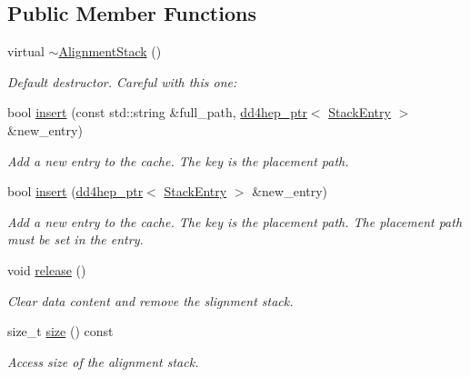 \subsection*{Public Member Functions}
\begin{DoxyCompactItemize}
\item 
virtual \hyperlink{class_d_d4hep_1_1_alignments_1_1_alignment_stack_aaa0a50b4ba221d1591a3cdadbc06153c}{$\sim$\+Alignment\+Stack} ()
\begin{DoxyCompactList}\small\item\em Default destructor. Careful with this one\+: \end{DoxyCompactList}\item 
bool \hyperlink{class_d_d4hep_1_1_alignments_1_1_alignment_stack_a9970de258fa1c3ea148a70de782f2398}{insert} (const std\+::string \&full\+\_\+path, \hyperlink{class_d_d4hep_1_1dd4hep__ptr}{dd4hep\+\_\+ptr}$<$ \hyperlink{struct_d_d4hep_1_1_alignments_1_1_alignment_stack_1_1_stack_entry}{Stack\+Entry} $>$ \&new\+\_\+entry)
\begin{DoxyCompactList}\small\item\em Add a new entry to the cache. The key is the placement path. \end{DoxyCompactList}\item 
bool \hyperlink{class_d_d4hep_1_1_alignments_1_1_alignment_stack_aefce20c233a0ad85d6a5c54ac2fb43b7}{insert} (\hyperlink{class_d_d4hep_1_1dd4hep__ptr}{dd4hep\+\_\+ptr}$<$ \hyperlink{struct_d_d4hep_1_1_alignments_1_1_alignment_stack_1_1_stack_entry}{Stack\+Entry} $>$ \&new\+\_\+entry)
\begin{DoxyCompactList}\small\item\em Add a new entry to the cache. The key is the placement path. The placement path must be set in the entry. \end{DoxyCompactList}\item 
void \hyperlink{class_d_d4hep_1_1_alignments_1_1_alignment_stack_aaf6353204aae5bda656bdda70d1161aa}{release} ()
\begin{DoxyCompactList}\small\item\em Clear data content and remove the slignment stack. \end{DoxyCompactList}\item 
size\+\_\+t \hyperlink{class_d_d4hep_1_1_alignments_1_1_alignment_stack_a7329d94949d0105b0090cb5580bd59d0}{size} () const
\begin{DoxyCompactList}\small\item\em Access size of the alignment stack. \end{DoxyCompactList}\item 

\end{DoxyCompactItemize}
